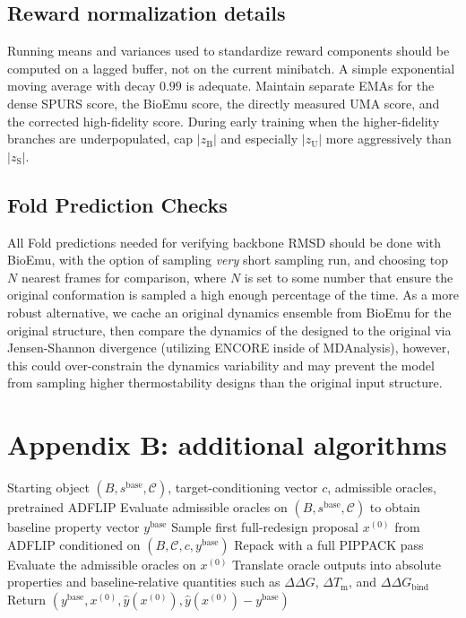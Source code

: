 \documentclass[11pt]{article}
\newcommand{\Tm}{\ensuremath{T_{\mathrm m}}}
\newcommand{\Cx}{\mathcal{C}}
\begin{document}
\subsection{Reward normalization details}

Running means and variances used to standardize reward components should be computed on a lagged buffer, not on the current minibatch. A simple exponential moving average with decay $0.99$ is adequate. Maintain separate EMAs for the dense SPURS score, the BioEmu score, the directly measured UMA score, and the corrected high-fidelity score. During early training when the higher-fidelity branches are underpopulated, cap $|z_{\mathrm B}|$ and especially $|z_{\mathrm U}|$ more aggressively than $|z_{\mathrm S}|$.

\subsection{Fold Prediction Checks}
All Fold predictions needed for verifying backbone RMSD should be done with BioEmu, with the option of sampling \emph{very} short sampling run, and choosing top $N$ nearest frames for comparison, where $N$ is set to some number that ensure the original conformation is sampled a high enough percentage of the time. As a more robust alternative, we cache an original dynamics ensemble from BioEmu for the original structure, then compare the dynamics of the designed to the original via Jensen-Shannon divergence (utilizing ENCORE inside of MDAnalysis), however, this could over-constrain the dynamics variability and may prevent the model from sampling higher thermostability designs than the original input structure. 

\section{Appendix B: additional algorithms}

\begin{algorithm}[H]
\caption{Baseline-aware scoring of the starting object and the first ADFLIP full redesign}
\label{alg:baseline_seed}
\begin{algorithmic}[1]
\Require Starting object $(B, s^{\mathrm{base}}, \Cx)$, target-conditioning vector $c$, admissible oracles, pretrained ADFLIP
\State Evaluate admissible oracles on $(B, s^{\mathrm{base}}, \Cx)$ to obtain baseline property vector $y^{\mathrm{base}}$
\State Sample first full-redesign proposal $x^{(0)}$ from ADFLIP conditioned on $(B,\Cx,c,y^{\mathrm{base}})$
\State Repack with a full PIPPACK pass
\State Evaluate the admissible oracles on $x^{(0)}$
\State Translate oracle outputs into absolute properties and baseline-relative quantities such as $\Delta\Delta G$, $\Delta \Tm$, and $\Delta\Delta G_{\mathrm{bind}}$
\State Return $(y^{\mathrm{base}}, x^{(0)}, \widehat y(x^{(0)}), \widehat y(x^{(0)})-y^{\mathrm{base}})$
\end{algorithmic}
\end{algorithm}
\end{document}
